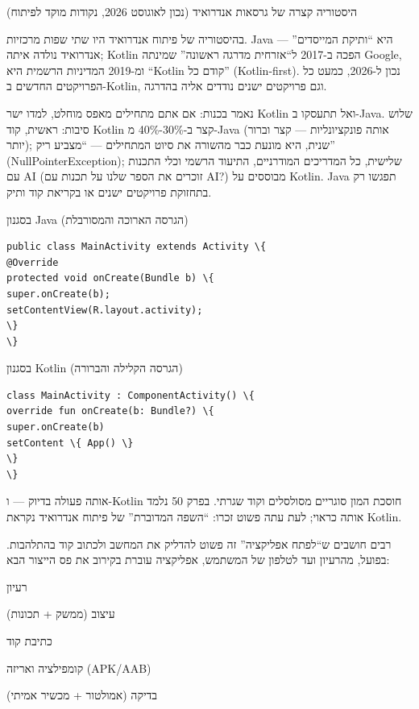 \begin{center}\small\color{gray}היסטוריה קצרה של גרסאות אנדרואיד (נכון לאוגוסט 2026, נקודות מוקד לפיתוח)\end{center}


בהיסטוריה של פיתוח אנדרואיד היו שתי שפות מרכזיות. Java היא “ותיקת המייסדים” — אנדרואיד נולדה איתה; Kotlin הפכה ב-2017 ל“אזרחית מדרגה ראשונה” שמינתה Google, ומ-2019 המדיניות הרשמית היא “Kotlin קודם כל” (Kotlin-first). נכון ל-2026, כמעט כל הפרויקטים החדשים ב-Kotlin, וגם פרויקטים ישנים נודדים אליה בהדרגה.

נאמר בכנות: אם אתם מתחילים מאפס מוחלט, למדו ישר Kotlin ואל תתעסקו ב-Java. שלוש סיבות: ראשית, קוד Kotlin קצר ב-30\%-40\% מ-Java (אותה פונקציונליות — קצר וברור יותר); שנית, היא מונעת כבר מהשורה את סיוט המתחילים — “מצביע ריק” (NullPointerException); שלישית, כל המדריכים המודרניים, התיעוד הרשמי וכלי התכנות עם AI (זוכרים את הספר שלנו על תכנות עם AI?) מבוססים על Kotlin. Java תפגשו רק בתחזוקת פרויקטים ישנים או בקריאת קוד ותיק.

בסגנון Java (הגרסה הארוכה והמסורבלת)

\begin{lstlisting}
public class MainActivity extends Activity \{
@Override
protected void onCreate(Bundle b) \{
super.onCreate(b);
setContentView(R.layout.activity);
\}
\}
\end{lstlisting}

בסגנון Kotlin (הגרסה הקלילה והברורה)

\begin{lstlisting}
class MainActivity : ComponentActivity() \{
override fun onCreate(b: Bundle?) \{
super.onCreate(b)
setContent \{ App() \}
\}
\}
\end{lstlisting}

אותה פעולה בדיוק — ו-Kotlin חוסכת המון סוגריים מסולסלים וקוד שגרתי. בפרק 50 נלמד אותה כראוי; לעת עתה פשוט זכרו: “השפה המדוברת” של פיתוח אנדרואיד נקראת Kotlin.


רבים חושבים ש“לפתח אפליקציה” זה פשוט להדליק את המחשב ולכתוב קוד בהתלהבות. בפועל, מהרעיון ועד לטלפון של המשתמש, אפליקציה עוברת בקירוב את פס הייצור הבא:

רעיון

עיצוב (ממשק + תכונות)

כתיבת קוד

קומפילציה ואריזה (APK/AAB)

בדיקה (אמולטור + מכשיר אמיתי)

